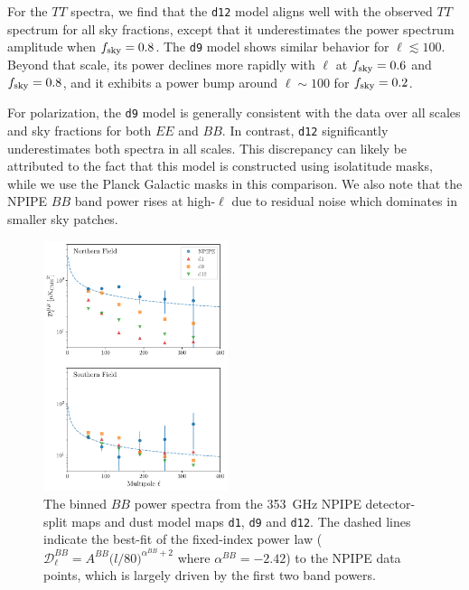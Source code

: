 \documentclass[twocolumn]{aastex631}
\begin{document}
For the $TT$ spectra, we find that the \texttt{d12} model aligns well with the observed $TT$ spectrum for all sky fractions, except that it underestimates the power spectrum amplitude when $f_{\rm sky} = 0.8$. The \texttt{d9} model shows similar behavior for $\ell \lesssim 100$. Beyond that scale, its power declines more rapidly with $\ell$ at $f_{\rm sky} = 0.6$ and $f_{\rm sky} = 0.8$, and it exhibits a power bump around $\ell \sim 100$ for $f_{\rm sky} = 0.2$.

For polarization, the \texttt{d9} model is generally consistent with the data over all scales and sky fractions for both $EE$ and $BB$. In contrast, \texttt{d12} significantly underestimates both spectra in all scales. This discrepancy can likely be attributed to the fact that this model is constructed using isolatitude masks, while we use the Planck Galactic masks in this comparison. We also note that the NPIPE $BB$ band power rises at high-$\ell$ due to residual noise which dominates in smaller sky patches.


\begin{figure}
    \centering
    \includegraphics[width=0.48\textwidth]{figures/smallfield_power.pdf}
    \caption{The binned $BB$ power spectra from the 353~GHz NPIPE detector-split maps and dust model maps \texttt{d1}, \texttt{d9} and \texttt{d12}. The dashed lines indicate the best-fit of the fixed-index power law ($\mathcal{D}_\ell^{BB} = A^{BB} \big( l/80 \big)^{\alpha^{BB}+2}$ where $\alpha^{BB} = -2.42$) to the NPIPE data points, which is largely driven by the first two band powers.}
    \label{fig:smallfield_power}
\end{figure}
\end{document}
